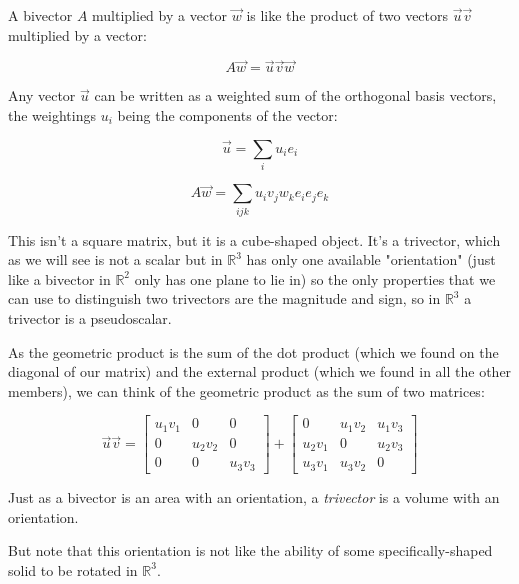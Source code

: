 A bivector $A$ multiplied by a vector $\vec{w}$ is like the product of two vectors $\vec{u}\vec{v}$ multiplied by a vector:

$$A\vec{w} = \vec{u}\vec{v}\vec{w} $$

Any vector $\vec{u}$ can be written as a weighted sum of the orthogonal basis vectors, the weightings $u_i$ being the components of the vector:

$$\vec{u} = \sum_i{u_i e_i}$$

$$A\vec{w} = \sum_{ijk}{u_i v_j w_k e_i e_j e_k}$$

This isn't a square matrix, but it is a cube-shaped object. It's a trivector, which as we will see is not a scalar but in $\mathbb{R}^3$ has only one available "orientation" (just like a bivector in $\mathbb{R}^2$ only has one plane to lie in) so the only properties that we can use to distinguish two trivectors are the magnitude and sign, so in $\mathbb{R}^3$ a trivector is a pseudoscalar.

As the geometric product is the sum of the dot product (which we found on the diagonal of our matrix) and the external product (which we found in all the other members), we can think of the geometric product as the sum of two matrices:

$$
\vec{u} \vec{v} =
\begin{bmatrix}
u_1 v_1 & 0 & 0 \\
0 & u_2 v_2 & 0 \\
0 & 0 & u_3 v_3
\end{bmatrix}
+
\begin{bmatrix}
0 & u_1 v_2 & u_1 v_3 \\
u_2 v_1 & 0 & u_2 v_3 \\
u_3 v_1 & u_3 v_2 & 0
\end{bmatrix}
$$

Just as a bivector is an area with an orientation, a \textit{trivector} is a volume with an orientation.

But note that this orientation is not like the ability of some specifically-shaped solid to be rotated in $\mathbb{R}^3$.

